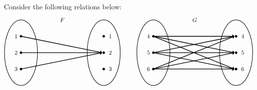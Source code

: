\documentclass[11pt,letterpaper]{article}
\begin{document}
\prob Consider the following relations below:
	\[
	\begin{tikzpicture}
	\node at (2.5,2) {$F$};
	\draw[line width=0.03cm] (0,0) circle (1 and 2);
	\draw[line width=0.03cm] (5,0) circle (1 and 2);
	
	\draw[fill=black] (0,1) circle (0.07);
	\draw[fill=black] (0,0) circle (0.07);
	\draw[fill=black] (0,-1) circle (0.07);
	
	\draw[fill=black] (5,1) circle (0.07);
	\draw[fill=black] (5,0) circle (0.07);
	\draw[fill=black] (5,-1) circle (0.07);
	
	\draw[line width=0.04cm,->] (0,1) -- (4.9,0);
	\draw[line width=0.04cm,->] (0,0) -- (4.9,0);
	\draw[line width=0.04cm,->] (0,-1) -- (4.9,0);
	
	\node at (-0.3,1) {$1$};
	\node at (-0.3,0) {$2$};
	\node at (-0.3,-1) {$3$};
	
	\node at (5.4,1) {$1$};
	\node at (5.4,0) {$2$};
	\node at (5.4,-1) {$3$};
	
	\tikzset{shift={(8,0)}}
	\node at (2.5,2) {$G$};
	\draw[line width=0.03cm] (0,0) circle (1 and 2);
	\draw[line width=0.03cm] (5,0) circle (1 and 2);
	
	\draw[fill=black] (0,1) circle (0.07);
	\draw[fill=black] (0,0) circle (0.07);
	\draw[fill=black] (0,-1) circle (0.07);
	
	\draw[fill=black] (5,1) circle (0.07);
	\draw[fill=black] (5,0) circle (0.07);
	\draw[fill=black] (5,-1) circle (0.07);
	
	\draw[line width=0.04cm,->] (0,1) -- (4.9,1);
	\draw[line width=0.04cm,->] (0,1) -- (4.9,0);
	\draw[line width=0.04cm,->] (0,1) -- (4.9,-1);
	\draw[line width=0.04cm,->] (0,0) -- (4.9,1);
	\draw[line width=0.04cm,->] (0,0) -- (4.9,0);
	\draw[line width=0.04cm,->] (0,0) -- (4.9,-1);
	\draw[line width=0.04cm,->] (0,-1) -- (4.9,1);
	\draw[line width=0.04cm,->] (0,-1) -- (4.9,0);
	\draw[line width=0.04cm,->] (0,-1) -- (4.9,-1);
	
	\node at (-0.3,1) {$4$};
	\node at (-0.3,0) {$5$};
	\node at (-0.3,-1) {$6$};
	
	\node at (5.4,1) {$4$};
	\node at (5.4,0) {$5$};
	\node at (5.4,-1) {$6$};
	\end{tikzpicture}
	\] \pspace
\end{document}
